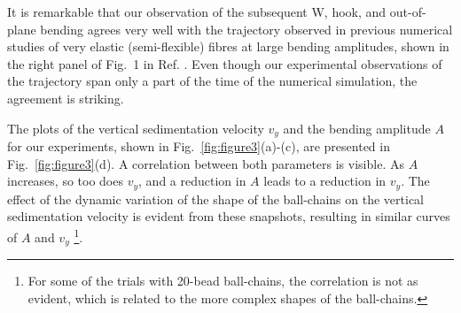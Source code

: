 \documentclass{article}
\begin{document}
It is remarkable that our observation of the subsequent W,  hook, and out-of-plane bending agrees very well with the %
trajectory observed in previous numerical studies of very elastic (semi-flexible) fibres at large bending amplitudes, shown in the right panel of Fig.~1 in Ref. \cite{saggiorato2015conformations}. %
Even though our experimental observations of the trajectory span only a part of the time of the numerical simulation, the agreement is striking.

The plots of the vertical sedimentation velocity $v_y$ and the bending amplitude $A$ for our experiments, shown in Fig.~\ref{fig:figure3}(a)-(c), are
presented in Fig.~\ref{fig:figure3}(d). A correlation between both parameters is visible. As $A$ increases, so too does $v_y$, and a reduction in $A$ leads to a reduction in $v_y$. The effect of the dynamic variation of the shape of the ball-chains on the vertical sedimentation velocity is evident from these snapshots, resulting in similar curves of $A$ and $v_y$
\footnote[3]{
    For some of the trials with 20-bead ball-chains, the correlation is not as evident, which is related to the more complex shapes of the ball-chains.
}.
\end{document}
